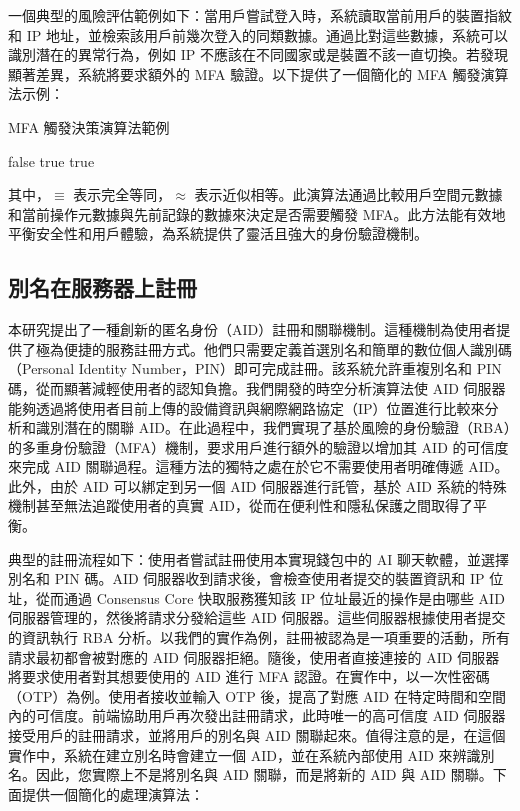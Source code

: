 一個典型的風險評估範例如下：當用戶嘗試登入時，系統讀取當前用戶的裝置指紋和 IP 地址，並檢索該用戶前幾次登入的同類數據。通過比對這些數據，系統可以識別潛在的異常行為，例如 IP 不應該在不同國家或是裝置不該一直切換。若發現顯著差異，系統將要求額外的 MFA 驗證。以下提供了一個簡化的 MFA 觸發演算法示例：

\begin{algorithm}
  \caption{MFA 觸發決策演算法範例}
  \begin{algorithmic}[1]
    \State \Return false
    \Else
    \State \Return true
    \EndIf
    \EndIf
    \State \Return true
    \EndFunction
  \end{algorithmic}
\end{algorithm}

其中，$\equiv$ 表示完全等同，$\approx$ 表示近似相等。此演算法通過比較用戶空間元數據和當前操作元數據與先前記錄的數據來決定是否需要觸發 MFA。此方法能有效地平衡安全性和用戶體驗，為系統提供了靈活且強大的身份驗證機制。

\subsection{別名在服務器上註冊}

本研究提出了一種創新的匿名身份（AID）註冊和關聯機制。這種機制為使用者提供了極為便捷的服務註冊方式。他們只需要定義首選別名和簡單的數位個人識別碼（Personal Identity Number，PIN）即可完成註冊。該系統允許重複別名和 PIN 碼，從而顯著減輕使用者的認知負擔。我們開發的時空分析演算法使 AID 伺服器能夠透過將使用者目前上傳的設備資訊與網際網路協定（IP）位置進行比較來分析和識別潛在的關聯 AID。在此過程中，我們實現了基於風險的身份驗證（RBA）的多重身份驗證（MFA）機制，要求用戶進行額外的驗證以增加其 AID 的可信度來完成 AID 關聯過程。這種方法的獨特之處在於它不需要使用者明確傳遞 AID。此外，由於 AID 可以綁定到另一個 AID 伺服器進行託管，基於 AID 系統的特殊機制甚至無法追蹤使用者的真實 AID，從而在便利性和隱私保護之間取得了平衡。

典型的註冊流程如下：使用者嘗試註冊使用本實現錢包中的 AI 聊天軟體，並選擇別名和 PIN 碼。AID 伺服器收到請求後，會檢查使用者提交的裝置資訊和 IP 位址，從而通過 Consensus Core 快取服務獲知該 IP 位址最近的操作是由哪些 AID 伺服器管理的，然後將請求分發給這些 AID 伺服器。這些伺服器根據使用者提交的資訊執行 RBA 分析。以我們的實作為例，註冊被認為是一項重要的活動，所有請求最初都會被對應的 AID 伺服器拒絕。隨後，使用者直接連接的 AID 伺服器將要求使用者對其想要使用的 AID 進行 MFA 認證。在實作中，以一次性密碼（OTP）為例。使用者接收並輸入 OTP 後，提高了對應 AID 在特定時間和空間內的可信度。前端協助用戶再次發出註冊請求，此時唯一的高可信度 AID 伺服器接受用戶的註冊請求，並將用戶的別名與 AID 關聯起來。值得注意的是，在這個實作中，系統在建立別名時會建立一個 AID，並在系統內部使用 AID 來辨識別名。因此，您實際上不是將別名與 AID 關聯，而是將新的 AID 與 AID 關聯。下面提供一個簡化的處理演算法：

